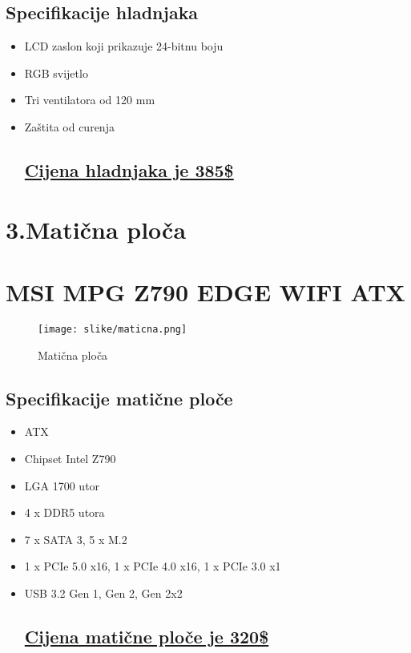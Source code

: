 \documentclass[12pt]{article}
\begin{document}
\subsection*{Specifikacije hladnjaka}
\begin{itemize}[label=--, left=0em]
    \item LCD zaslon koji prikazuje 24-bitnu boju
    \item RGB svijetlo
    \item Tri ventilatora od 120 mm
    \item Zaštita od curenja
\subsection*{\href{https://www.amazon.com/dp/B09GKPTYG6}{Cijena hladnjaka je 385\$}}
\end{itemize}

\newpage
\section*{\Huge 3.Matična ploča}
\section*{\large MSI MPG Z790 EDGE WIFI ATX}
\begin{figure}[h]
    \centering
    \texttt{[image: slike/maticna.png]} 
    \caption{Matična ploča}
\end{figure}
\subsection*{Specifikacije matične ploče}
\begin{itemize}[label=--, left=0em]
    \item ATX
    \item Chipset Intel Z790
    \item LGA 1700 utor
    \item 4 x DDR5 utora
    \item 7 x SATA 3, 5 x M.2
    \item 1 x PCIe 5.0 x16, 1 x PCIe 4.0 x16, 1 x PCIe 3.0 x1 
    \item USB 3.2 Gen 1, Gen 2, Gen 2x2
\subsection*{\href{https://www.amazon.com/dp/B0BL92SPJQ}{Cijena matične ploče je 320\$}}
\end{itemize}
\end{document}

